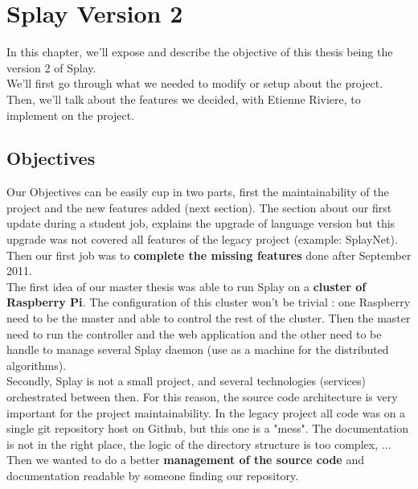 \documentclass{eplmastersthesis}
\begin{document}
  \chapter{Splay Version 2} %

    In this chapter, we'll expose and describe the objective of this thesis
    being the version 2 of Splay.\\

    We'll first go through what we needed to modify or setup about the project.
    Then, we'll talk about the features we decided, with Etienne Riviere, to
    implement on the project.

    \section{Objectives} %

      Our Objectives can be easily cup in two parts, first the maintainability
      of the project and the new features added (next section). The section
      about our first update during a student job, explains the upgrade of
      language version but this upgrade was not covered all features of the
      legacy project (example: SplayNet). Then our first job was to
      \textbf{complete the missing features} done after  September 2011.\\

      The first idea of our master thesis was able to run Splay on a
      \textbf{cluster of Raspberry Pi}. The configuration of this cluster won't
      be trivial : one Raspberry need to be the master and able to control the
      rest of the cluster. Then the master need to run the controller and the
      web application and the other need to be handle to manage several Splay
      daemon (use as a machine for the distributed algorithms). \\

      Secondly, Splay is not a small project, and several technologies
      (services) orchestrated between then. For this reason, the source code
      architecture is very important for the project maintainability. In the
      legacy project all code was on a single git repository host on Github,
      but this one is a "mess". The documentation is not in the right place,
      the logic of the directory structure is too complex, ... Then we wanted
      to do a better \textbf{management of the source code} and documentation
      readable by someone finding our repository. \\
\end{document}
